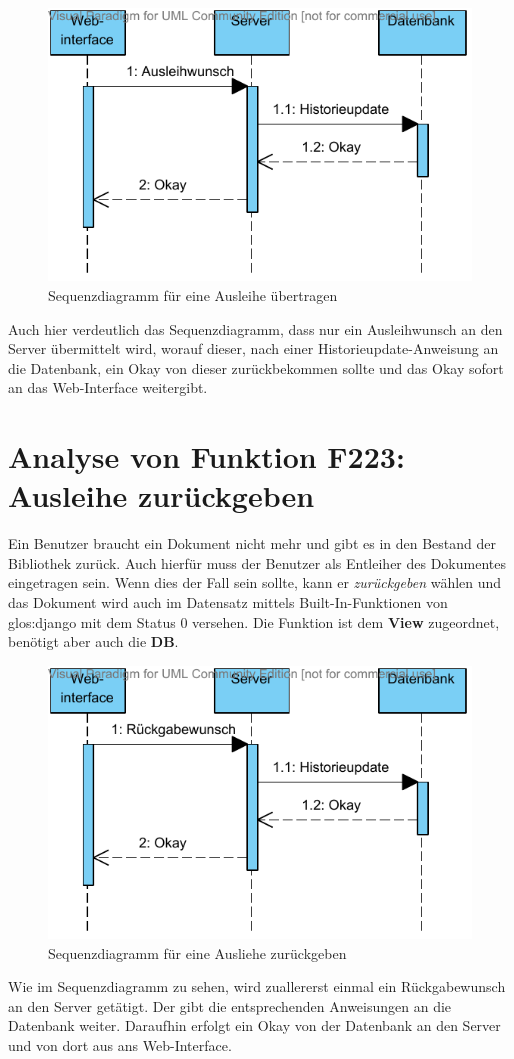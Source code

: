 \begin{figure}[H]
\begin{center}
\includegraphics[width=0.8\linewidth]{bilder/seq-uebertragen.pdf}
\caption{Sequenzdiagramm für eine Ausleihe übertragen}
\label{fig:222}
\end{center}
\end{figure}
Auch hier verdeutlich das Sequenzdiagramm, dass nur ein Ausleihwunsch an den Server übermittelt wird, worauf dieser, nach einer Historieupdate-Anweisung an die Datenbank, ein Okay von dieser zurückbekommen sollte und das Okay sofort an das Web-Interface weitergibt.

\section{Analyse von Funktion F223: Ausleihe zurückgeben}
\label{f:223}
Ein Benutzer braucht ein Dokument nicht mehr und gibt es in den Bestand der 
Bibliothek zurück. Auch hierfür muss der Benutzer als Entleiher des Dokumentes 
eingetragen sein. Wenn dies der Fall sein sollte, kann er \emph{zurückgeben} 
wählen und das Dokument wird auch im Datensatz mittels Built-In-Funktionen von 
\gls{glos:django} mit dem Status 0 versehen. Die Funktion ist dem \textbf{View} 
zugeordnet, benötigt aber auch die \textbf{DB}.

\begin{figure}[H]
\begin{center}
\includegraphics[width=0.8\linewidth]{bilder/seq-zurueck.pdf}
\caption{Sequenzdiagramm für eine Ausliehe zurückgeben}
\label{fig:223}
\end{center}
\end{figure}
Wie im Sequenzdiagramm zu sehen, wird zuallererst einmal ein Rückgabewunsch an den Server getätigt. Der gibt die entsprechenden Anweisungen an die Datenbank weiter. Daraufhin erfolgt ein Okay von der Datenbank an den Server und von dort aus ans Web-Interface.

